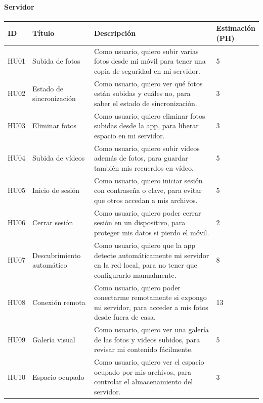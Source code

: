 \paragraph{Servidor}
\renewcommand{\arraystretch}{1.3} %

\begin{tabularx}{\textwidth}{|l|l|>{\raggedright\arraybackslash}X|l|}
    \hline
\textbf{ID} & \textbf{Título} & \textbf{Descripción} & \makecell{\textbf{Estimación}\\\textbf{(PH)}} \\
    \hline
    HU01 & Subida de fotos & Como usuario, quiero subir varias fotos desde mi móvil para tener una copia de seguridad en mi servidor. & 5 \\
    \hline
    HU02 & Estado de sincronización & Como usuario, quiero ver qué fotos están subidas y cuáles no, para saber el estado de sincronización. & 3 \\
    \hline
    HU03 & Eliminar fotos & Como usuario, quiero eliminar fotos subidas desde la app, para liberar espacio en mi servidor. & 3 \\
    \hline
    HU04 & Subida de vídeos & Como usuario, quiero subir vídeos además de fotos, para guardar también mis recuerdos en vídeo. & 5 \\
    \hline
    HU05 & Inicio de sesión & Como usuario, quiero iniciar sesión con contraseña o clave, para evitar que otros accedan a mis archivos. & 5 \\
    \hline
    HU06 & Cerrar sesión & Como usuario, quiero poder cerrar sesión en un dispositivo, para proteger mis datos si pierdo el móvil. & 2 \\
    \hline
    HU07 & Descubrimiento automático & Como usuario, quiero que la app detecte automáticamente mi servidor en la red local, para no tener que configurarlo manualmente. & 8 \\
    \hline
    HU08 & Conexión remota & Como usuario, quiero poder conectarme remotamente si expongo mi servidor, para acceder a mis fotos desde fuera de casa. & 13 \\
    \hline
    HU09 & Galería visual & Como usuario, quiero ver una galería de las fotos y videos subidos, para revisar mi contenido fácilmente. & 5 \\
    \hline
    HU10 & Espacio ocupado & Como usuario, quiero ver el espacio ocupado por mis archivos, para controlar el almacenamiento del servidor. & 3 \\

\end{tabularx}

